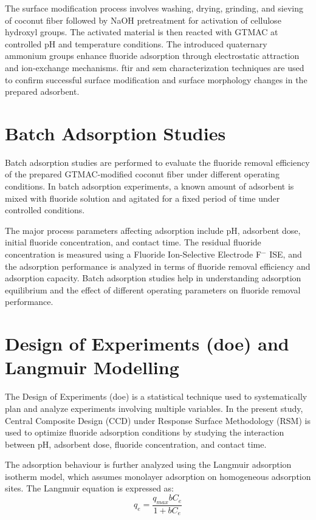 The surface modification process involves washing, drying, grinding, and sieving of coconut fiber followed by NaOH pretreatment for activation of cellulose hydroxyl groups. The activated material is then reacted with GTMAC at controlled pH and temperature conditions. The introduced quaternary ammonium groups enhance fluoride adsorption through electrostatic attraction and ion-exchange mechanisms. \gls{ftir} and \gls{sem} characterization techniques are used to confirm successful surface modification and surface morphology changes in the prepared adsorbent. 
 
\section{Batch Adsorption Studies}
Batch adsorption studies are performed to evaluate the fluoride removal efficiency of the prepared GTMAC-modified coconut fiber under different operating conditions. In batch adsorption experiments, a known amount of adsorbent is mixed with fluoride solution and agitated for a fixed period of time under controlled conditions. 

The major process parameters affecting adsorption include pH, adsorbent dose, initial fluoride concentration, and contact time. The residual fluoride concentration is measured using a Fluoride Ion-Selective Electrode F$^{-}$ ISE, and the adsorption performance is analyzed in terms of fluoride removal efficiency and adsorption capacity. Batch adsorption studies help in understanding adsorption equilibrium and the effect of different operating parameters on fluoride removal performance. 

\section{Design of Experiments (\gls{doe}) and Langmuir Modelling}
The Design of Experiments (\gls{doe}) is a statistical technique used to systematically plan and analyze experiments involving multiple variables. In the present study, Central Composite Design (CCD) under Response Surface Methodology (RSM) is used to optimize fluoride adsorption conditions by studying the interaction between pH, adsorbent dose, fluoride concentration, and contact time. 

The adsorption behaviour is further analyzed using the Langmuir adsorption isotherm model, which assumes monolayer adsorption on homogeneous adsorption sites. The Langmuir equation is expressed as: 
\begin{equation}
	q_e = \frac{q_{max} b C_e}{1 + b C_e}
	\label{eq:langmuir}
\end{equation}

